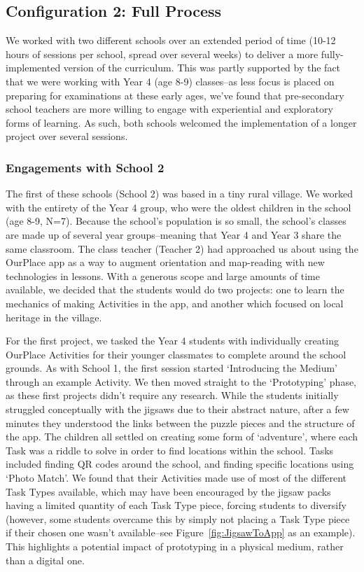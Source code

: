 \documentclass[,hyphens]{sigchi}
\begin{document}
\subsection{Configuration 2: Full Process}
We worked with two different schools over an extended period of time (10-12 hours of sessions per school, spread over several weeks) to deliver a more fully-implemented version of the curriculum. This was partly supported by the fact that we were working with Year 4 (age 8-9) classes--as less focus is placed on preparing for examinations at these early ages, we've  found that pre-secondary school teachers are more willing to engage with experiential and exploratory forms of learning. As such, both schools welcomed the implementation of a longer project over several sessions.

\subsubsection{Engagements with School 2}
The first of these schools (School 2) was based in a tiny rural village. We worked with the entirety of the Year 4 group, who were the oldest children in the school (age 8-9, N=7). Because the school's population is so small, the school's classes are made up of several year groups--meaning that Year 4 and Year 3 share the same classroom. The class teacher (Teacher 2) had approached us about using the OurPlace app as a way to augment orientation and map-reading with new technologies in lessons. With a generous scope and large amounts of time available, we decided that the students would do two projects: one to learn the mechanics of making Activities in the app, and another which focused on local heritage in the village. 

For the first project, we tasked the Year 4 students with individually creating OurPlace Activities for their younger classmates to complete around the school grounds. As with School 1, the first session started `Introducing the Medium' through an example Activity. We then moved straight to the `Prototyping' phase, as these first projects didn't require any research. While the students initially struggled conceptually with the jigsaws due to their abstract nature, after a few minutes they understood the links between the puzzle pieces and the structure of the app. The children all settled on creating some form of `adventure', where each Task was a riddle to solve in order to find locations within the school. Tasks included finding QR codes around the school, and finding specific locations using `Photo Match'. We found that their Activities made use of most of the different Task Types available, which may have been encouraged by the jigsaw packs having a limited quantity of each Task Type piece, forcing students to diversify (however, some students overcame this by simply not placing a Task Type piece if their chosen one wasn't available--see Figure~\ref{fig:JigsawToApp} as an example). This highlights a potential impact of prototyping in a physical medium, rather than a digital one.
\end{document}
